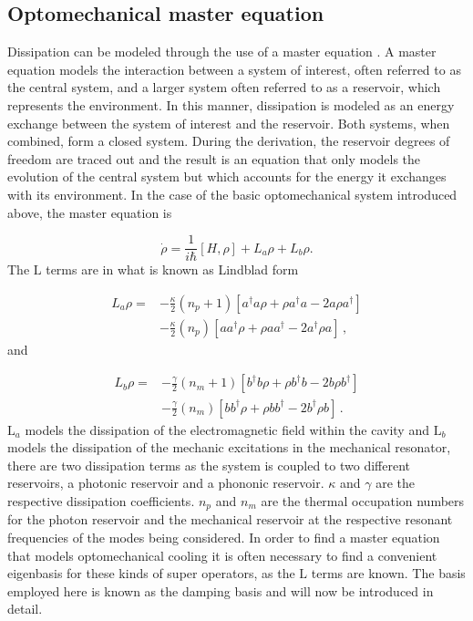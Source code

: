 \documentclass[12pt]{article}
\begin{document}
\subsection{Optomechanical master equation}

Dissipation can be modeled through the use of a master equation \cite{CarmichaelQuantumOptics1999}. A master equation models the interaction between a system of interest, often referred to as the central system, and a larger system often referred to as a reservoir, which represents the environment. In this manner, dissipation is modeled as an energy exchange between the system of interest and the reservoir. Both systems, when combined, form a closed system. During the derivation, the reservoir degrees of freedom are traced out and the result is an equation that only models the evolution of the central system but which accounts for the energy it exchanges with its environment. In the case of the basic optomechanical system introduced above, the master equation is

\begin{equation} \label{eq:OptoMechanicalMasterEquation}
\dot{\rho} = \frac{1}{i\hbar}[H,\rho] +L_a\rho + L_b \rho.
\end{equation} The $\mathrm{L}$ terms are in what is known as Lindblad form 

\begin{align}
L_a \rho =& - \frac{\kappa}{2}(n_p + 1)[a^\dagger a\rho + \rho a^\dagger a -2a\rho a^\dagger]  \\
 &- \frac{\kappa}{2}(n_p)[ aa^\dagger\rho + \rho  aa^\dagger -2a^\dagger\rho a]\, ,\nonumber
\end{align} and

\begin{align}
L_b \rho =& - \frac{\gamma}{2}(n_m + 1)[b^\dagger b\rho + \rho b^\dagger b -2b\rho b^\dagger]  \\
 &- \frac{\gamma}{2}(n_m)[ bb^\dagger\rho + \rho  bb^\dagger -2b^\dagger\rho b]\, .\nonumber
\end{align} $\mathrm{L}_a$ models the dissipation of the electromagnetic field within the cavity and $\mathrm{L}_b$ models the dissipation of the mechanic excitations in the mechanical resonator, there are two dissipation terms as the system is coupled to two different reservoirs, a photonic reservoir and a phononic reservoir. $\kappa$ and $\gamma$ are the respective dissipation coefficients. $n_p$ and $n_m$ are the thermal occupation numbers for the photon reservoir and the mechanical reservoir at the respective resonant frequencies of the modes being considered. In order to find a master equation that models optomechanical cooling it is often necessary to find a convenient eigenbasis for these kinds of super operators, as the $\mathrm{L}$ terms are known. The basis employed here is known as the damping basis and will now be introduced in detail. 
\end{document}
